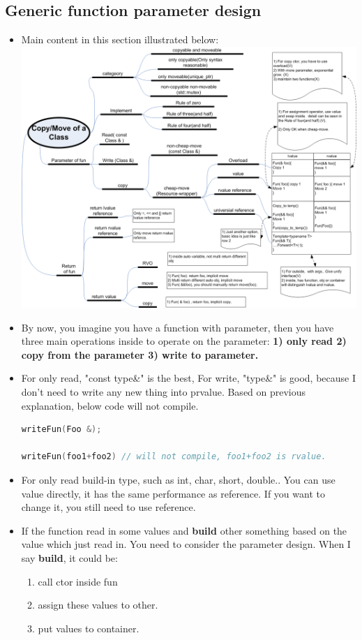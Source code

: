\documentclass[a4paper,12pt,twoside]{book}
\begin{document}
\subsection{Generic function parameter design}
\begin{itemize}
\item Main content in this section illustrated below: \\
\includegraphics[scale=0.7, angle=270]{pics/move.png}

\item  By now, you imagine you have a function with parameter, then you have three main operations inside to operate on the parameter: \textbf{1) only read 2) copy from the parameter 3) write to parameter.}

\item For only read, "const type\&" is the best, For write, "type\&" is good, because I don't need to write any new thing into prvalue. Based on previous explanation, below code will not compile. 
\begin{lstlisting}[frame=single, language=c++]
writeFun(Foo &);

writeFun(foo1+foo2) // will not compile, foo1+foo2 is rvalue.
\end{lstlisting}

\item For only read build-in type, such as int, char, short, double.. You can use value directly, it has the same performance as reference. If you want to change it, you still need to use reference.

\item If the function read in some values and \textbf{build} other something based on the value which just read in. You need to consider the parameter design. When I say \textbf{build}, it could be:
\begin{enumerate}
	\item call ctor inside fun
	\item assign these values to other.
	\item put values to container.
\end{enumerate} 
\end{itemize}
\end{document}
